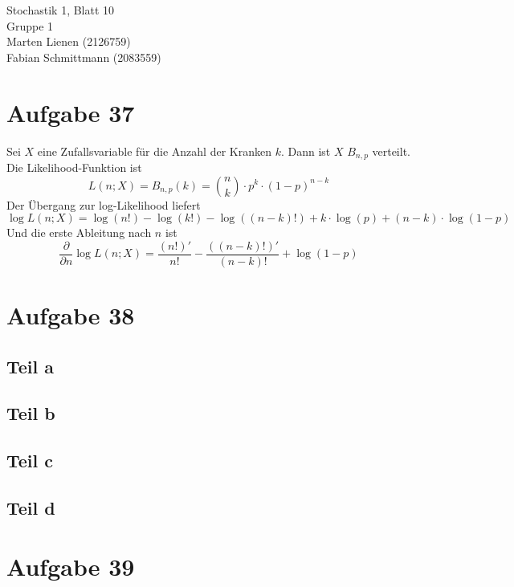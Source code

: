 \documentclass[10pt,a4paper]{article}
\begin{document}
Stochastik 1, Blatt 10\\
Gruppe 1\\
Marten Lienen (2126759)\\
Fabian Schmittmann (2083559)

\section{Aufgabe 37}

Sei $X$ eine Zufallsvariable für die Anzahl der Kranken $k$.
Dann ist $X$ $B_{n,p}$ verteilt.
Die Likelihood-Funktion ist
\begin{equation}
  L(n; X) = B_{n, p}(k) = \binom{n}{k} \cdot p^{k} \cdot (1 - p)^{n - k}
\end{equation}
Der Übergang zur log-Likelihood liefert
\begin{equation}
  \log L(n; X) = \log(n!) - \log(k!) - \log((n - k)!) + k \cdot \log(p) + (n - k) \cdot \log(1 - p)
\end{equation}
Und die erste Ableitung nach $n$ ist
\begin{equation}
  \frac{\partial}{\partial n} \log L(n; X) = \frac{(n!)'}{n!} - \frac{((n - k)!)'}{(n - k)!} + \log(1 - p)
\end{equation}

\section{Aufgabe 38}

\subsection{Teil a}

\subsection{Teil b}

\subsection{Teil c}

\subsection{Teil d}

\section{Aufgabe 39}
\end{document}
